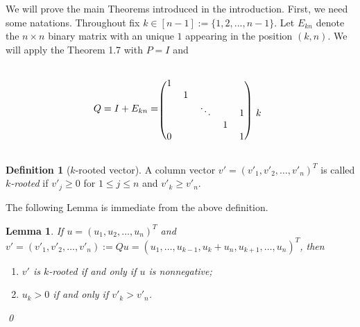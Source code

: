 \documentclass[12pt]{report}
\theoremstyle{plain}
\newtheorem{lem}[thm]{Lemma}
\theoremstyle{definition}
\newtheorem{defn}[thm]{Definition}
\begin{document}
We will prove the main Theorems introduced in the introduction. First, we need some natations.
 Throughout fix $k \in [n-1] := \{1,2,...,n-1\}$. Let $E_{kn}$ denote the $n\times n$ binary matrix with an unique $1$ appearing in the  position $(k,n)$. We will apply the Theorem 1.7 with $P=I$ and 



\begin{equation} 
Q=I+E_{kn}=\begin{blockarray}{cccccc} 
 &  &  & & & \\  
\begin{block}{(ccccc)c}
  1 &   &   &   &   &  \\
    & 1 &   &   &   &  \\
    &   & \ddots &   & 1 & k \\
    &   &   & 1 &   &  \\
  0 &   &   &   & 1 &  \\
\end{block}
\end{blockarray}
\end{equation}  \label{Q_1}


\begin{defn}[$k$-rooted vector]%
 A column vector $v'=(v'_1,v'_2,\ldots,v'_n)^T$ is called {\it $k$-rooted}  if $v'_{j} \geq 0$ for $1 \leq  j \leq n$ and $v'_k\geq v'_n.$
\end{defn}
\bigskip

The following Lemma is immediate from the above definition.
\bigskip

\begin{lem}\label{lem:rt_vec}
If $u=(u_1, u_2, \ldots, u_n)^T$ and $v'=(v'_1, v'_2, \ldots, v'_n):=Qu=(u_1,\ldots, u_{k-1},u_k+u_n, u_{k+1}, \ldots,  u_n)^T$, then
\begin{enumerate}[label=(\roman*)]
\item \label{lem:rt_vec:en1}$v'$ is $k$-rooted  if and only if  $u$ is nonnegative;
\item $u_k>0$ if and only if $v'_k>v'_n$.
\end{enumerate}
\qed
\end{lem}
\end{document}
